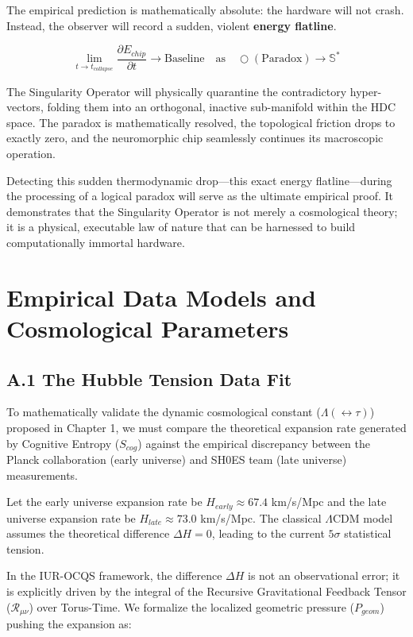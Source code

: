 \documentclass[12pt,openany]{book}
\begin{document}
The empirical prediction is mathematically absolute: the hardware will not crash. Instead, the observer will record a sudden, violent \textbf{energy flatline}. 

\begin{equation}
\lim_{t \to t_{collapse}} \frac{\partial E_{chip}}{\partial t} \to \text{Baseline} \quad \text{as} \quad \bigcirc(\text{Paradox}) \to \mathbb{S}^*
\end{equation}

The Singularity Operator will physically quarantine the contradictory hyper-vectors, folding them into an orthogonal, inactive sub-manifold within the HDC space. The paradox is mathematically resolved, the topological friction drops to exactly zero, and the neuromorphic chip seamlessly continues its macroscopic operation.

Detecting this sudden thermodynamic drop—this exact energy flatline—during the processing of a logical paradox will serve as the ultimate empirical proof. It demonstrates that the Singularity Operator is not merely a cosmological theory; it is a physical, executable law of nature that can be harnessed to build computationally immortal hardware.

\appendix

\chapter{Empirical Data Models and Cosmological Parameters}

\section{A.1 The Hubble Tension Data Fit}
To mathematically validate the dynamic cosmological constant ($\Lambda(\leftrightarrow\tau)$) proposed in Chapter 1, we must compare the theoretical expansion rate generated by Cognitive Entropy ($S_{cog}$) against the empirical discrepancy between the Planck collaboration (early universe) and SH0ES team (late universe) measurements.

Let the early universe expansion rate be $H_{early} \approx 67.4$ km/s/Mpc and the late universe expansion rate be $H_{late} \approx 73.0$ km/s/Mpc. The classical $\Lambda$CDM model assumes the theoretical difference $\Delta H = 0$, leading to the current $5\sigma$ statistical tension. 

In the IUR-OCQS framework, the difference $\Delta H$ is not an observational error; it is explicitly driven by the integral of the Recursive Gravitational Feedback Tensor ($\mathcal{R}_{\mu\nu}$) over Torus-Time. We formalize the localized geometric pressure ($P_{geom}$) pushing the expansion as:
\end{document}
